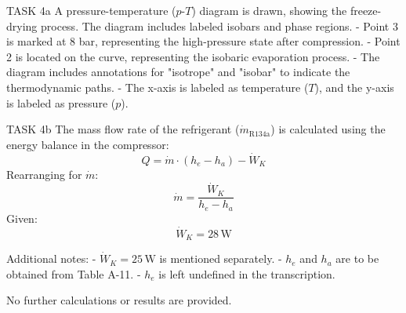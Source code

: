 TASK 4a  
A pressure-temperature (\( p \)-\( T \)) diagram is drawn, showing the freeze-drying process. The diagram includes labeled isobars and phase regions.  
- Point 3 is marked at 8 bar, representing the high-pressure state after compression.  
- Point 2 is located on the curve, representing the isobaric evaporation process.  
- The diagram includes annotations for "isotrope" and "isobar" to indicate the thermodynamic paths.  
- The x-axis is labeled as temperature (\( T \)), and the y-axis is labeled as pressure (\( p \)).  

TASK 4b  
The mass flow rate of the refrigerant (\( \dot{m}_{\text{R134a}} \)) is calculated using the energy balance in the compressor:  
\[
Q = \dot{m} \cdot (h_e - h_a) - \dot{W}_K
\]  
Rearranging for \( \dot{m} \):  
\[
\dot{m} = \frac{\dot{W}_K}{h_e - h_a}
\]  
Given:  
\[
\dot{W}_K = 28 \, \text{W}
\]  

Additional notes:  
- \( \dot{W}_K = 25 \, \text{W} \) is mentioned separately.  
- \( h_e \) and \( h_a \) are to be obtained from Table A-11.  
- \( h_e \) is left undefined in the transcription.  

No further calculations or results are provided.